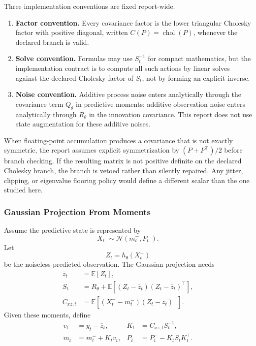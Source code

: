 \documentclass[11pt]{article}
\numberwithin{equation}{section}
\newcommand{\E}{\mathbb E}
\newcommand{\N}{\mathcal N}
\newcommand{\chol}{\operatorname{chol}}
\begin{document}
Three implementation conventions are fixed report-wide.
\begin{enumerate}[leftmargin=0.28in]
  \item \textbf{Factor convention.}  Every covariance factor is the lower
  triangular Cholesky factor with positive diagonal, written
  \(C(P)=\chol(P)\), whenever the declared branch is valid.
  \item \textbf{Solve convention.}  Formulas may use \(S_t^{-1}\) for compact
  mathematics, but the implementation contract is to compute all such actions by
  linear solves against the declared Cholesky factor of \(S_t\), not by forming
  an explicit inverse.
  \item \textbf{Noise convention.}  Additive process noise enters analytically
  through the covariance term \(Q_\theta\) in predictive moments; additive
  observation noise enters analytically through \(R_\theta\) in the innovation
  covariance.  This report does not use state augmentation for these additive
  noises.
\end{enumerate}

When floating-point accumulation produces a covariance that is not exactly
symmetric, the report assumes explicit symmetrization by
\((P+P^\top)/2\) before branch checking.  If the resulting matrix is not
positive definite on the declared Cholesky branch, the branch is vetoed rather
than silently repaired.  Any jitter, clipping, or eigenvalue flooring policy
would define a different scalar than the one studied here.

\subsubsection{Gaussian Projection From Moments}
\label{sec:p31-gaussian-projection}

Assume the predictive state is represented by
\begin{equation}
  X_t^-\sim\N(m_t^-,P_t^-).
  \label{eq:p31-predictive-gaussian}
\end{equation}
Let
\begin{equation}
  Z_t=h_\theta(X_t^-)
  \label{eq:p31-predicted-observation}
\end{equation}
be the noiseless predicted observation.  The Gaussian projection needs
\begin{align}
  \bar z_t &= \E[Z_t],
  \label{eq:p31-zbar}\\
  S_t &= R_\theta+\E[(Z_t-\bar z_t)(Z_t-\bar z_t)^\top],
  \label{eq:p31-S}\\
  C_{xz,t}&=\E[(X_t^- -m_t^-)(Z_t-\bar z_t)^\top].
  \label{eq:p31-Cxz}
\end{align}
Given these moments, define
\begin{align}
  v_t&=y_t-\bar z_t,
  &
  K_t&=C_{xz,t}S_t^{-1},
  \label{eq:p31-v-K}\\
  m_t&=m_t^-+K_tv_t,
  &
  P_t&=P_t^- - K_tS_tK_t^\top.
  \label{eq:p31-projection-update}
\end{align}
\end{document}
